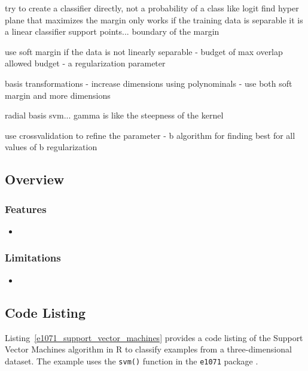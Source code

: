 try to create a classifier directly, not a probability of a class like logit
find hyper plane that maximizes the margin
only works if the training data is separable
it is a linear classifier
support points... boundary of the margin

use soft margin if the data is not linearly separable - budget of max overlap allowed
budget - a regularization parameter

basis transformations - increase dimensions using polynominals
- use both soft margin and more dimensions

radial basis svm...
gamma is like the steepness of the kernel

use crossvalidation to refine the parameter - b
algorithm for finding best for all values of b
regularization



\subsection{Overview}

\subsubsection{Features}

\begin{itemize}
	\item 
\end{itemize}

\subsubsection{Limitations}

\begin{itemize}
	\item 
\end{itemize}


\subsection{Code Listing}
Listing~\ref{e1071_support_vector_machines} provides a code listing of the Support Vector Machines algorithm in R to classify examples from a three-dimensional dataset.
The example uses the \texttt{svm()} function in the \texttt{e1071} package \cite{Meyer2011}.

